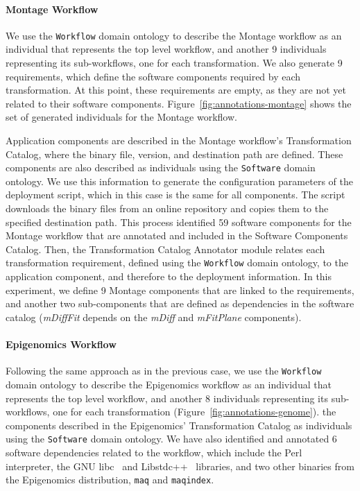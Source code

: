 \paragraph{\textbf{Montage Workflow}}
We use the \texttt{Workflow} domain ontology to describe the Montage workflow 
as an individual that represents the top level workflow, and another 9 individuals 
representing its sub-workflows, one for each transformation. We also generate 9 
requirements, which define the software components required by each transformation. 
At this point, these requirements are empty, as they are not yet related to their 
software components. Figure~\ref{fig:annotations-montage} shows the set of 
generated individuals for the Montage workflow.

Application components are described in the Montage workflow's Transformation 
Catalog, where the binary file, version, and destination path are defined. These 
components are also described as individuals using the \texttt{Software} domain 
ontology. We use this information to generate the configuration parameters of the 
deployment script, which in this case is the same for all components. The script 
downloads the binary files from an online repository and copies them to the specified 
destination path. This process identified 59 software components for the Montage 
workflow that are annotated and included in the Software Components Catalog.
Then, the Transformation Catalog Annotator module relates each transformation 
requirement, defined using the \texttt{Workflow} domain ontology, to the application 
component, and therefore to the deployment information. In this experiment, we 
define 9 Montage components that are linked to the requirements, and another two 
sub-components that are defined as dependencies in the software catalog 
(\emph{mDiffFit} depends on the \emph{mDiff} and \emph{mFitPlane} components).


\paragraph{\textbf{Epigenomics Workflow}}
Following the same approach as in the previous case, we use the \texttt{Workflow} 
domain ontology to describe the Epigenomics workflow as an individual that represents 
the top level workflow, and another 8 individuals representing its sub-workflows, one 
for each transformation (Figure~\ref{fig:annotations-genome}).  
the components described in the Epigenomics' Transformation Catalog as individuals 
using the \texttt{Software} domain ontology. We have also identified and annotated 6 
software dependencies related to the workflow, which include the Perl~\cite{perl} interpreter, 
the GNU libc~\cite{libc} and Libstdc++~\cite{libstdc} libraries, and two other binaries from 
the Epigenomics  distribution, \texttt{maq} and \texttt{maqindex}.


